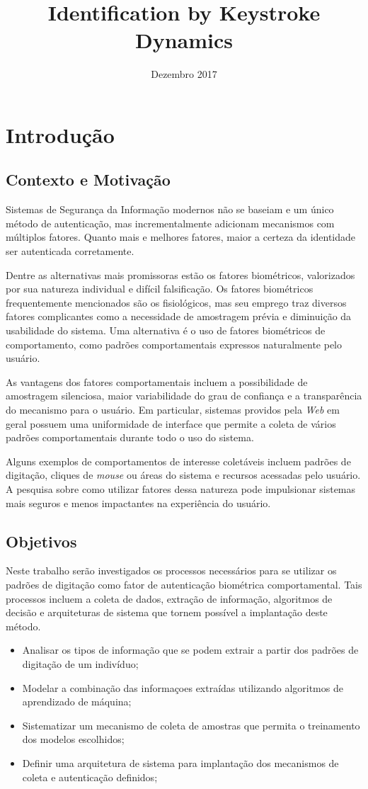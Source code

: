 \documentclass[pfc]{imetex}
\title{Identification by Keystroke Dynamics}
\date{Dezembro 2017}
\begin{document}
\chapter{Introdução}

\section{Contexto e Motivação}
Sistemas de Segurança da Informação modernos não se baseiam e um único método de autenticação, mas incrementalmente adicionam mecanismos com múltiplos fatores. Quanto mais e melhores fatores, maior a certeza da identidade ser autenticada corretamente.

Dentre as alternativas mais promissoras estão os fatores biométricos, valorizados por sua natureza individual e difícil falsificação. Os fatores biométricos frequentemente mencionados são os fisiológicos, mas seu emprego traz diversos fatores complicantes como a necessidade de amostragem prévia e diminuição da usabilidade do sistema. Uma alternativa é o uso de fatores biométricos de comportamento, como padrões comportamentais expressos naturalmente pelo usuário.

As vantagens dos fatores comportamentais incluem a possibilidade de amostragem silenciosa, maior variabilidade do grau de confiança e a transparência do mecanismo para o usuário. Em particular, sistemas providos pela \textit{Web} em geral possuem uma uniformidade de interface que permite a coleta de vários padrões comportamentais durante todo o uso do sistema.

Alguns exemplos de comportamentos de interesse coletáveis incluem padrões de digitação, cliques de \textit{mouse} ou áreas do sistema e recursos acessadas pelo usuário. A pesquisa sobre como utilizar fatores dessa natureza pode impulsionar sistemas mais seguros e menos impactantes na experiência do usuário.

\section{Objetivos}
Neste trabalho serão investigados os processos necessários para se utilizar os padrões de digitação como fator de autenticação biométrica comportamental. Tais processos incluem a coleta de dados, extração de informação, algoritmos de decisão e arquiteturas de sistema que tornem possível a implantação deste método.

\begin{itemize}
\item Analisar os tipos de informação que se podem extrair a partir dos padrões de digitação de um indivíduo;
\item Modelar a combinação das informaçoes extraídas utilizando algoritmos de aprendizado de máquina;
\item Sistematizar um mecanismo de coleta de amostras que permita o treinamento dos modelos escolhidos;
\item Definir uma arquitetura de sistema para implantação dos mecanismos de coleta e autenticação definidos;
\end{itemize}
\end{document}
